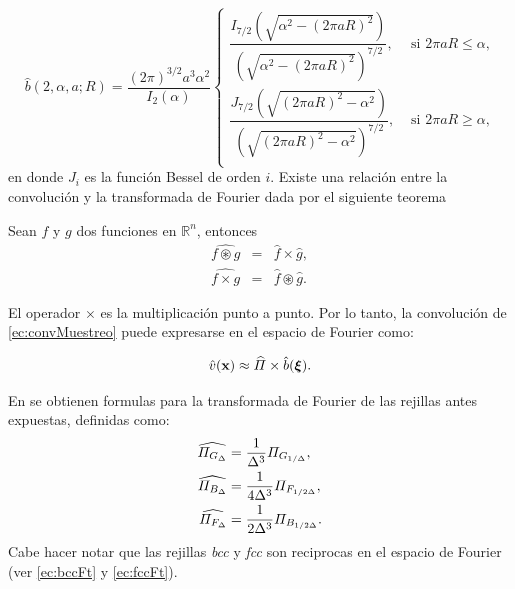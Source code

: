 \begin{equation}
\label{ec:blobFT}
 \hat{b}(2, \alpha, a; R) = \dfrac{(2 \pi)^{3/2} a^3 \alpha^2}{I_2(\alpha)}\begin{cases}
            \dfrac{ I_{ 7 / 2 } \left( \sqrt{ \alpha^{2} - (2 \pi a R)^{2}}  \right) } { \left( \sqrt{\alpha^2 - (2 \pi a R) ^2}  \right)^{ 7 / 2 }}, & \text{ si $2 \pi a R \leq \alpha$,} \\
            \dfrac{ J_{ 7 / 2 } \left( \sqrt{ (2 \pi a R)^{2} - \alpha^{2}}  \right) } { \left( \sqrt{(2 \pi a R)^{2} - \alpha^{2}}  \right)^{ 7 / 2 }}, & \text{ si $2 \pi a R \geq \alpha$,} \\
            \end{cases}
\end{equation}
en donde $J_i$ es la función Bessel de orden $i$. Existe una relación entre la convolución y la transformada de Fourier dada por el siguiente teorema
\begin{teoSN}[Convolución]
Sean $f$ y $g$ dos funciones en $\mathbb{R}^{n}$, entonces 
\begin{eqnarray}
 \label{ec:convTheorem}
 \widehat{f \circledast g} & = & \hat{f} \times \hat{g}, \\
 \nonumber
  \widehat{f \times g} & = & \hat{f} \circledast \hat{g}. 
\end{eqnarray}
\end{teoSN}
El operador $\times$ es la multiplicación punto a punto. Por lo tanto, la convolución de \eqref{ec:convMuestreo} puede expresarse en el espacio de Fourier como:

\begin{equation}
 \hat{v}(\textbf{x}) \approx \widehat{\varPi} \times \hat{b} (\bm \xi).
 \label{ec:muestreoConvolucion}
\end{equation}

En \cite{Edgar:Thesis} se obtienen formulas para la transformada de Fourier de las rejillas antes expuestas, definidas como:
\begin{eqnarray}
 \label{ec:scFt}
 \widehat{\varPi_{G_\Delta}} & = \frac{1}{\Delta^3} \varPi_{G_{1 / \Delta}}, \\
 \label{ec:bccFt}
 \widehat{\varPi_{B_\Delta}} & = \frac{1}{4 \Delta^3} \varPi_{F_{1 / 2 \Delta}}, \\
 \label{ec:fccFt}
 \widehat{\varPi_{F_\Delta}} & = \frac{1}{2 \Delta^3} \varPi_{B_{1 / 2 \Delta}}.
\end{eqnarray}
Cabe hacer notar que las rejillas \emph{bcc} y \emph{fcc} son reciprocas en el espacio de Fourier (ver \eqref{ec:bccFt} y \eqref{ec:fccFt}).

